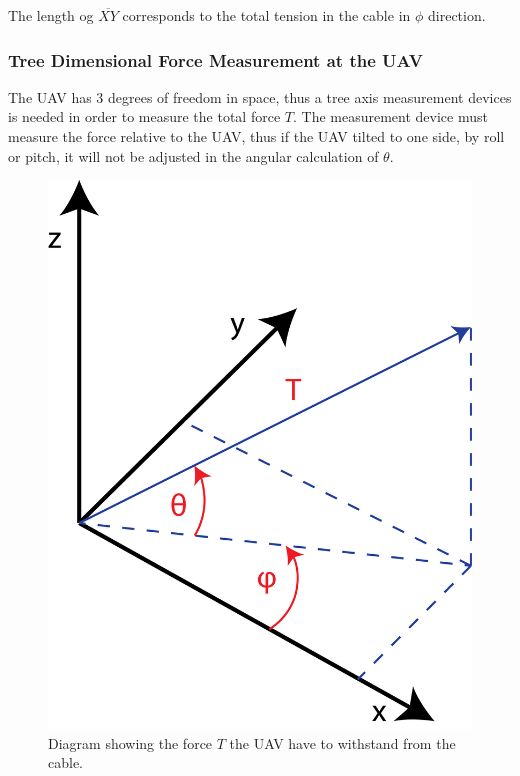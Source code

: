 \noindent
The length og $\overline{XY}$ corresponds to the total tension in the cable in $\phi$ direction. 

\subsubsection{Tree Dimensional Force Measurement at the UAV}
The UAV has 3 degrees of freedom in space, thus a tree axis measurement devices is needed in order to measure the total force $T$.  The measurement device must measure the force relative to the UAV, thus if the UAV tilted to one side, by roll or pitch, it will not be adjusted in the angular calculation of $\theta$.  

\begin{figure}[hbtp]
\centering
\includegraphics[scale=0.5]{graphics/UAV-force-diagram.png}
\caption[Force diagram for UAV]{Diagram showing the force $T$ the UAV have to withstand from the cable.}
\end{figure}

